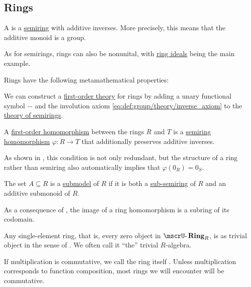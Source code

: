 \subsection{Rings}\label{subsec:rings}

\begin{definition}\label{def:ring}
  A  is a \hyperref[def:semiring]{semiring} with additive inverses. More precisely, this means that the additive monoid is a group.

  As for semirings, rings can also be nonunital, with \hyperref[def:semiring_ideal]{ring ideals} being the main example.

  Rings have the following metamathematical properties:
  \begin{thmenum}
     We can construct a \hyperref[def:first_order_theory]{first-order theory} for rings by adding a unary functional symbol \( - \) and the involution axiom \eqref{eq:def:group/theory/inverse_axiom} to the \hyperref[def:semiring/theory]{theory of semirings}.

     A \hyperref[def:first_order_homomorphism]{first-order homomorphism} between the rings \( R \) and \( T \) is a \hyperref[def:semiring/homomorphism]{semiring homomorphism} \( \varphi: R \to T \) that additionally preserves additive inverses.

    As shown in , this condition is not only redundant, but the structure of a ring rather than semiring also automatically implies that \( \varphi(0_R) = 0_S \).

     The set \( A \subseteq R \) is a \hyperref[def:first_order_submodel]{submodel} of \( R \) if it is both a \hyperref[def:semiring]{sub-semiring} of \( R \) and an additive submonoid of \( R \).

    As a consequence of , the image of a ring homomorphism is a subring of its codomain.

     Any single-element ring, that is, every zero object in \( \ucat{Ring}_R \), is as trivial object in the sense of . We often call it \enquote{the} trivial \( R \)-algebra.

     If multiplication is commutative, we call the ring itself . Unless multiplication corresponds to function composition, most rings we will encounter will be commutative.


\end{thmenum}
\end{definition}
